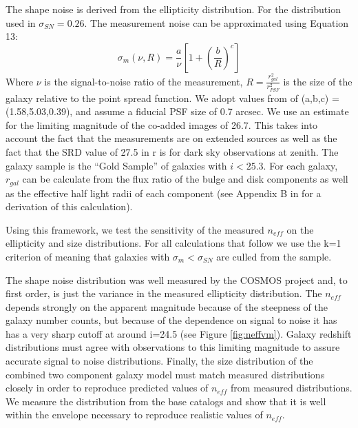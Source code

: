 \documentclass[]{article}
\begin{document}
{The shape noise is derived from the ellipticity distribution.  For the distribution used in \citet{chang} $\sigma_{SN} = 0.26$.
The measurement noise can be approximated using Equation 13:
\begin{equation}
\sigma_m(\nu,R) = \frac{a}{\nu}\left[1+\left(\frac{b}{R}\right)^c\right]
\end{equation}
Where $\nu$ is the signal-to-noise ratio of the measurement, $R=\frac{r_{gal}^2}{r_{PSF}^2}$ is the size of the galaxy relative to
the point spread function.  We adopt values from \citet{chang} of (a,b,c) = (1.58,5.03,0.39), and assume a fiducial
PSF size of 0.7 arcsec. We use an estimate for the limiting magnitude of the co-added images
of 26.7.  This takes into account the fact that the measurements are on extended sources as well as the fact that the SRD value 
of 27.5 in r is for dark sky observations at zenith.   The galaxy sample is the ``Gold Sample'' of galaxies with $i < 25.3$.
For each galaxy, $r_{gal}$ can be calculate from the flux ratio of the bulge and disk components as well as the effective half light 
radii of each component (see Appendix B in \citet{chang} for a derivation of this calculation).

Using this framework, we test the sensitivity of the measured $n_{eff}$ on the ellipticity and size distributions.  For all calculations that follow we 
use the k=1 criterion of \citet{chang} meaning that galaxies with $\sigma_m < \sigma_{SN}$ are culled from the sample.

The shape noise distribution was well measured by the COSMOS project \citep{cosmos} and, to first order, is just the variance in the measured 
ellipticity distribution.  The $n_{eff}$ depends strongly on the apparent magnitude because of the steepness of the galaxy number
counts, but because of the dependence on signal to noise it has
has a very sharp cutoff at around i=24.5 (see Figure \ref{fig:neffvm}).  Galaxy redshift distributions must
agree with observations to this limiting magnitude to assure accurate signal to noise distributions.  Finally, the size distribution
of the combined two component galaxy model must match measured distributions closely in order to reproduce predicted
values of $n_{eff}$ from measured distributions.  We measure the distribution from the base catalogs and show that it is well
within the envelope necessary to reproduce realistic values of $n_{eff}$.

}
\end{document}
